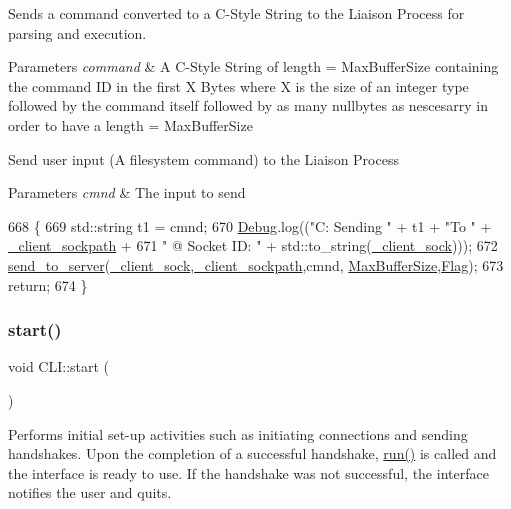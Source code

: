 Sends a command converted to a C-\/\+Style String to the Liaison Process for parsing and execution.


\begin{DoxyParams}{Parameters}
{\em command} & A C-\/\+Style String of length = Max\+Buffer\+Size containing the command ID in the first X Bytes where X is the size of an integer type followed by the command itself followed by as many nullbytes as nescesarry in order to have a length = Max\+Buffer\+Size\\
\hline
\end{DoxyParams}
Send user input (A filesystem command) to the Liaison Process 
\begin{DoxyParams}{Parameters}
{\em cmnd} & The input to send \\
\hline
\end{DoxyParams}

\begin{DoxyCode}
668 \{
669   std::string t1 = cmnd;
670   \mbox{\hyperlink{_cli_8h_ab6d95a4e6a59b4ad033ed3af31d878e0}{Debug}}.log((\textcolor{stringliteral}{"C: Sending "} + t1 + \textcolor{stringliteral}{"To "} + \mbox{\hyperlink{class_c_l_i_ad3b7579608f8c2e1d4c01a8668f701d9}{\_client\_sockpath}} +
671              \textcolor{stringliteral}{" @ Socket ID: "} + std::to\_string(\mbox{\hyperlink{class_c_l_i_a89c215687bff66a3e0359a17bac3657d}{\_client\_sock}})));
672   \mbox{\hyperlink{cli__helper_8hpp_a17a8dc79ae7d148b9eebc9698d404aa5}{send\_to\_server}}(\mbox{\hyperlink{class_c_l_i_a89c215687bff66a3e0359a17bac3657d}{\_client\_sock}},\mbox{\hyperlink{class_c_l_i_ad3b7579608f8c2e1d4c01a8668f701d9}{\_client\_sockpath}},cmnd,
      \mbox{\hyperlink{_cli_8h_a97a33a33e5428e13cfa0eff5ba0e846f}{MaxBufferSize}},\mbox{\hyperlink{_cli_8h_a1ca03d8f367ec7987b5a7321fe82e23e}{Flag}});
673   \textcolor{keywordflow}{return};
674 \}
\end{DoxyCode}
\mbox{\label{class_c_l_i_a1492005f186392031bd4d447cb20e975}} 
\subsubsection{\texorpdfstring{start()}{start()}}
{\footnotesize\ttfamily void C\+L\+I\+::start (\begin{DoxyParamCaption}{ }\end{DoxyParamCaption})}

Performs initial set-\/up activities such as initiating connections and sending handshakes. Upon the completion of a successful handshake, \mbox{\hyperlink{class_c_l_i_aeefc8cd81999836a90c2cfaced6177f1}{run()}} is called and the interface is ready to use. If the handshake was not successful, the interface notifies the user and quits.

